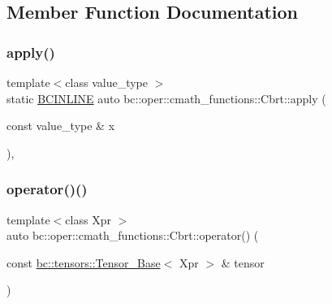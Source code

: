 \subsection{Member Function Documentation}
\mbox{\label{structbc_1_1oper_1_1cmath__functions_1_1Cbrt_a95a73ba5b5e9ab8f90782e7bea728e59}} 
\subsubsection{\texorpdfstring{apply()}{apply()}}
{\footnotesize\ttfamily template$<$class value\+\_\+type $>$ \\
static \hyperlink{common_8h_a6699e8b0449da5c0fafb878e59c1d4b1}{B\+C\+I\+N\+L\+I\+NE} auto bc\+::oper\+::cmath\+\_\+functions\+::\+Cbrt\+::apply (\begin{DoxyParamCaption}\item[{const value\+\_\+type \&}]{x }\end{DoxyParamCaption})\hspace{0.3cm}{\ttfamily [inline]}, {\ttfamily [static]}}

\mbox{\label{structbc_1_1oper_1_1cmath__functions_1_1Cbrt_a7ed05c07cf4bb16022e48b3245645b04}} 
\subsubsection{\texorpdfstring{operator()()}{operator()()}\hspace{0.1cm}{\footnotesize\ttfamily [1/3]}}
{\footnotesize\ttfamily template$<$class Xpr $>$ \\
auto bc\+::oper\+::cmath\+\_\+functions\+::\+Cbrt\+::operator() (\begin{DoxyParamCaption}\item[{const \hyperlink{classbc_1_1tensors_1_1Tensor__Base}{bc\+::tensors\+::\+Tensor\+\_\+\+Base}$<$ Xpr $>$ \&}]{tensor }\end{DoxyParamCaption})\hspace{0.3cm}{\ttfamily [inline]}}

